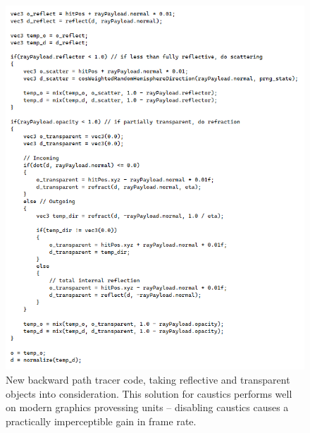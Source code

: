 \documentclass[10pt]{article}
\begin{document}
\begin{figure} 
\centering
  \includegraphics[width = 6 in]{code.png}
  \caption{ New backward path tracer code, taking reflective and transparent objects into consideration.
This solution for caustics performs well on modern graphics provessing units -- disabling caustics causes a practically imperceptible gain in frame rate.
}
\end{figure}
\end{document}
